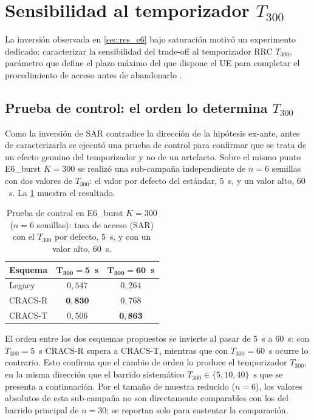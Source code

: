 \section{Sensibilidad al temporizador $T_{300}$}
\label{sec:res_e7}

La inversión observada en \cref{sec:res_e6} bajo saturación motivó un experimento dedicado: caracterizar la sensibilidad del trade-off al temporizador RRC $T_{300}$, parámetro que define el plazo máximo del que dispone el UE para completar el procedimiento de acceso antes de abandonarlo \cite{ref18}.

\subsection{Prueba de control: el orden lo determina $T_{300}$}
\label{sec:res_e7_ab}

Como la inversión de SAR contradice la dirección de la hipótesis ex-ante, antes de caracterizarla se ejecutó una prueba de control para confirmar que se trata de un efecto genuino del temporizador y no de un artefacto. Sobre el mismo punto E6\_burst $K{=}300$ se realizó una sub-campaña independiente de $n=6$ semillas con dos valores de $T_{300}$: el valor por defecto del estándar, $5$~s, y un valor alto, $60$~s. La \cref{tab:res_ab_t300} muestra el resultado.

\begin{table}[H]
\centering
\caption{Prueba de control en E6\_burst $K=300$ ($n=6$ semillas): tasa de acceso (SAR) con el $T_{300}$ por defecto, $5$~s, y con un valor alto, $60$~s.}
\label{tab:res_ab_t300}
\small
\renewcommand{\arraystretch}{1.15}
\begin{tabular}{@{}l c c@{}}
\toprule
\textbf{Esquema} & $\boldsymbol{T_{300}{=}5}$~\textbf{s} & $\boldsymbol{T_{300}{=}60}$~\textbf{s} \\
\midrule
Legacy  & $0{,}547$ & $0{,}264$ \\
CRACS-R & $\mathbf{0{,}830}$ & $0{,}768$ \\
CRACS-T & $0{,}506$ & $\mathbf{0{,}863}$ \\
\bottomrule
\end{tabular}
\end{table}

El orden entre los dos esquemas propuestos se invierte al pasar de $5$~s a $60$~s: con $T_{300}=5$~s CRACS-R supera a CRACS-T, mientras que con $T_{300}=60$~s ocurre lo contrario. Esto confirma que el cambio de orden lo produce el temporizador $T_{300}$, en la misma dirección que el barrido sistemático $T_{300}\in\{5,10,40\}$~s que se presenta a continuación. Por el tamaño de muestra reducido ($n=6$), los valores absolutos de esta sub-campaña no son directamente comparables con los del barrido principal de $n=30$; se reportan solo para sustentar la comparación.

